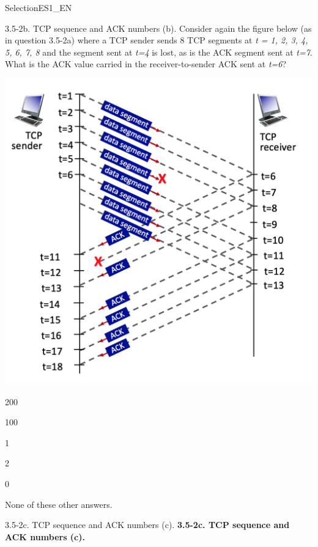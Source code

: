 \documentclass[a4paper]{article}
\begin{document}
\begin{quiz}{SelectionES1\_EN}
\begin{multi}[points=1,shuffle]{3.5-2b. TCP sequence and ACK numbers (b).}
Consider again the figure below (as in question 3.5-2a) where a TCP sender sends 8 TCP segments at \emph{t = 1, 2, 3, 4, 5, 6, 7, 8} and the segment sent at \emph{t=4} is lost, as is the ACK segment sent at \emph{t=7}. What is the ACK value carried in the receiver-to-sender ACK sent at \emph{t=6}?
\begin{center}
	\includegraphics[width=\linewidth]{figs/tcp_seq_ack_1.jpg}
\end{center}
\item 200
\item* 100
\item 1
\item 2
\item 0
\item None of these other answers.
\end{multi}

\begin{multi}[points=1,shuffle]{3.5-2c. TCP sequence and ACK numbers (c).}
\textbf{3.5-2c. TCP sequence and ACK numbers (c).}


\end{multi}
\end{quiz}
\end{document}
